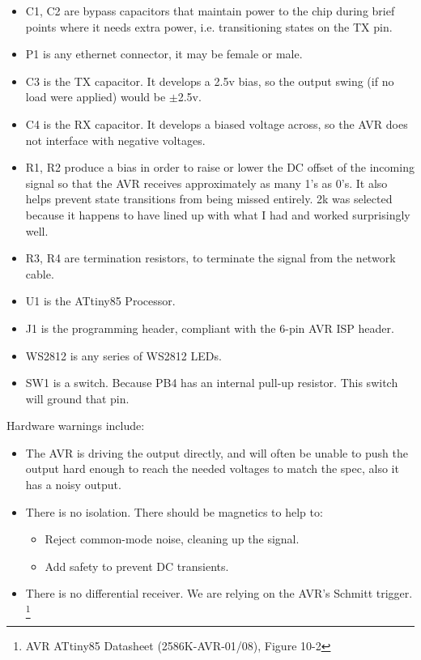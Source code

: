 \documentclass[13pt]{ltxdoc}
\begin{document}
\begin{itemize}
\item C1, C2 are bypass capacitors that maintain power to the chip during brief points where it needs extra power, i.e. transitioning states on the TX pin.
\item P1 is any ethernet connector, it may be female or male.
\item C3 is the TX capacitor.  It develops a 2.5v bias, so the output swing (if no load were applied) would be $\pm$2.5v.
\item C4 is the RX capacitor.  It develops a biased voltage across, so the AVR does not interface with negative voltages.
\item R1, R2 produce a bias in order to raise or lower the DC offset of the incoming signal so that the AVR receives approximately as many 1's as 0's.  It also helps prevent state transitions from being missed entirely.  2k was selected because it happens to have lined up with what I had and worked surprisingly well.
\item R3, R4 are termination resistors, to terminate the signal from the network cable.
\item U1 is the ATtiny85 Processor.
\item J1 is the programming header, compliant with the 6-pin AVR ISP header.
\item WS2812 is any series of WS2812 LEDs.
\item SW1 is a switch.  Because PB4 has an internal pull-up resistor.  This switch will ground that pin.
\end{itemize}

Hardware warnings include:
\begin{itemize}
\item The AVR is driving the output directly, and will often be unable to push the output hard enough to reach the needed voltages to match the spec, also it has a noisy output.
\item There is no isolation.  There should be magnetics to help to:
\begin{itemize}
\item Reject common-mode noise, cleaning up the signal.
\item Add safety to prevent DC transients.
\end{itemize}
\item There is no differential receiver. We are relying on the AVR's Schmitt trigger. \footnote{AVR ATtiny85 Datasheet (2586K-AVR-01/08), Figure 10-2}
\end{itemize}
\end{document}

